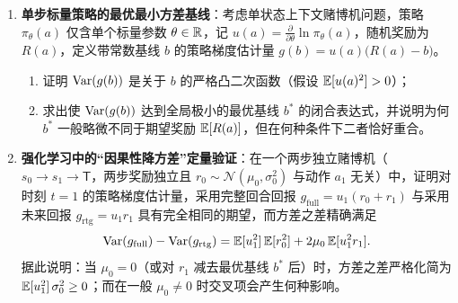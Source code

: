 \begin{enumerate}
  \item[\textbf{6.2.3}] \textbf{单步标量策略的最优最小方差基线}：考虑单状态上下文赌博机问题，策略 $\pi_\theta(a)$ 仅含单个标量参数 $\theta \in \mathbb{R}$，记 $u(a) = \frac{\partial}{\partial\theta}\ln \pi_\theta(a)$，随机奖励为 $R(a)$，定义带常数基线 $b$ 的策略梯度估计量 $g(b) = u(a)\big(R(a) - b\big)$。
  \begin{enumerate}
    \item 证明 $\operatorname{Var}(g(b))$ 是关于 $b$ 的严格凸二次函数（假设 $\mathbb{E}[u(a)^2] > 0$）；
    \item 求出使 $\operatorname{Var}(g(b))$ 达到全局极小的最优基线 $b^*$ 的闭合表达式，并说明为何 $b^*$ 一般略微不同于期望奖励 $\mathbb{E}[R(a)]$，但在何种条件下二者恰好重合。
  \end{enumerate}

  \item[\textbf{6.2.4}] \textbf{强化学习中的“因果性降方差”定量验证}：在一个两步独立赌博机（$s_0 \to s_1 \to \mathsf{T}$，两步奖励独立且 $r_0 \sim \mathcal{N}(\mu_0, \sigma_0^2)$ 与动作 $a_1$ 无关）中，证明对时刻 $t=1$ 的策略梯度估计量，采用完整回合回报 $g_{\mathrm{full}} = u_1(r_0 + r_1)$ 与采用未来回报 $g_{\mathrm{rtg}} = u_1 r_1$ 具有完全相同的期望，而方差之差精确满足
  \[
    \operatorname{Var}(g_{\mathrm{full}}) - \operatorname{Var}(g_{\mathrm{rtg}}) = \mathbb{E}[u_1^2]\,\mathbb{E}[r_0^2] + 2\mu_0\,\mathbb{E}[u_1^2 r_1].
  \]
  据此说明：当 $\mu_0 = 0$（或对 $r_1$ 减去最优基线 $b^*$ 后）时，方差之差严格化简为 $\mathbb{E}[u_1^2]\,\sigma_0^2 \ge 0$；而在一般 $\mu_0 \neq 0$ 时交叉项会产生何种影响。
\end{enumerate}



